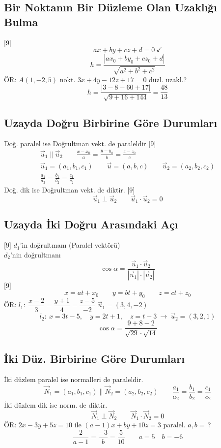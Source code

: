 \documentclass[11pt,a4paper]{article}
\begin{document}
\subsection{Bir Noktanın Bir Düzleme Olan Uzaklığı Bulma}
[9]
\[ ax+by+cz+d=0\ \checkmark \]
\[ h=\frac{|ax_0+by_0+cz_0+d|}{\sqrt{a^2+b^2+c^2}} \]
ÖR: $A(1,-2,5)$ nokt. $3x+4y-12z+17=0$ düzl. uzakl.?
\[ h=\frac{|3-8-60+17|}{\sqrt{9+16+144}}=\frac{48}{13} \]

\subsection{Uzayda Doğru Birbirine Göre Durumları}
Doğ. paralel ise Doğrultman vekt. de paraleldir
[9]
\begin{gather*}
\vec u_1\parallel\vec u_2\qquad \frac{x-x_0}{a}=\frac{y-y_0}{b}=\frac{z-z_0}{c}\\
\vec u_1=(a_1,b_1,c_1)\qquad \vec u=(a,b,c)\qquad \vec u_2=(a_2,b_2,c_2)\\
\frac{a_1}{a_2}=\frac{b_1}{b_2}=\frac{c_1}{c_2}
\end{gather*}
Doğ. dik ise Doğrultman vekt. de diktir.
[9]
\[ \vec u_1\perp\vec u_2\qquad \vec u_1\cdot\vec u_2=0 \]

\subsection{Uzayda İki Doğru Arasındaki Açı}
[9]
$d_1$'in doğrultmanı (Paralel vektörü)\\
$d_2$'nin doğrultmanı
\[ \cos\alpha=\frac{\vec u_1\cdot\vec u_2}{|\vec u_1|\cdot|\vec u_2|} \]
[9]
\[ x=at+x_0\qquad y=bt+y_0\qquad z=ct+z_0 \]
ÖR: $l_1:\ \dfrac{x-2}{3}=\dfrac{y+1}{4}=\dfrac{z-5}{-2}$ \qquad $\vec u_1=(3,4,-2)$
\[ l_2:\ x=3t-5,\quad y=2t+1,\quad z=t-3\ \to\ \vec u_2=(3,2,1) \]
\[ \cos\alpha=\frac{9+8-2}{\sqrt{29}\cdot\sqrt{14}} \]

\subsection{İki Düz. Birbirine Göre Durumları}
İki düzlem paralel ise normalleri de paraleldir.
\[ \vec N_1=(a_1,b_1,c_1)\parallel\vec N_2=(a_2,b_2,c_2)\qquad \frac{a_1}{a_2}=\frac{b_1}{b_2}=\frac{c_1}{c_2} \]
İki düzlem dik ise norm. de diktir.
\[ \vec N_1\perp\vec N_2\qquad \vec N_1\cdot\vec N_2=0 \]
ÖR: $2x-3y+5z=10$ ile $(a-1)x+by+10z=3$ paralel. $a,b=\,$?
\[ \frac{2}{a-1}=\frac{-3}{b}=\frac{5}{10}\qquad a=5\quad b=-6 \]
\end{document}
